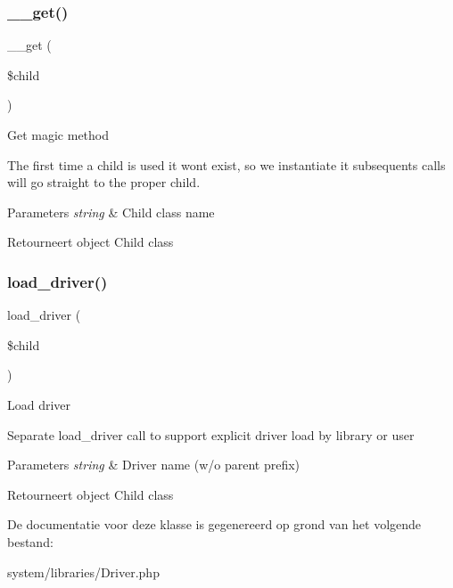 \subsubsection{\texorpdfstring{\_\_get()}{\_\_get()}}
{\footnotesize\ttfamily \+\_\+\+\_\+get (\begin{DoxyParamCaption}\item[{}]{\$child }\end{DoxyParamCaption})}

Get magic method

The first time a child is used it won\textquotesingle{}t exist, so we instantiate it subsequents calls will go straight to the proper child.


\begin{DoxyParams}{Parameters}
{\em string} & Child class name \\
\hline
\end{DoxyParams}
\begin{DoxyReturn}{Retourneert}
object Child class 
\end{DoxyReturn}
\mbox{\label{class_c_i___driver___library_a7cc2908487e106164664ef7d743690b8}} 
\subsubsection{\texorpdfstring{load\_driver()}{load\_driver()}}
{\footnotesize\ttfamily load\+\_\+driver (\begin{DoxyParamCaption}\item[{}]{\$child }\end{DoxyParamCaption})}

Load driver

Separate load\+\_\+driver call to support explicit driver load by library or user


\begin{DoxyParams}{Parameters}
{\em string} & Driver name (w/o parent prefix) \\
\hline
\end{DoxyParams}
\begin{DoxyReturn}{Retourneert}
object Child class 
\end{DoxyReturn}


De documentatie voor deze klasse is gegenereerd op grond van het volgende bestand\+:\begin{DoxyCompactItemize}
\item 
system/libraries/Driver.\+php\end{DoxyCompactItemize}
